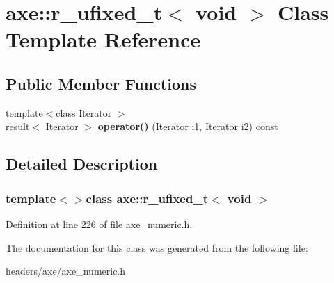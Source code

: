 \hypertarget{classaxe_1_1r__ufixed__t_3_01void_01_4}{\section{axe\+:\+:r\+\_\+ufixed\+\_\+t$<$ void $>$ Class Template Reference}
\label{classaxe_1_1r__ufixed__t_3_01void_01_4}
}
\subsection*{Public Member Functions}
\begin{DoxyCompactItemize}
\item 
\hypertarget{classaxe_1_1r__ufixed__t_3_01void_01_4_a1afe9c1a3c765371717f32177472ef38}{{\footnotesize template$<$class Iterator $>$ }\\\hyperlink{structaxe_1_1result}{result}$<$ Iterator $>$ {\bfseries operator()} (Iterator i1, Iterator i2) const }\label{classaxe_1_1r__ufixed__t_3_01void_01_4_a1afe9c1a3c765371717f32177472ef38}

\end{DoxyCompactItemize}


\subsection{Detailed Description}
\subsubsection*{template$<$$>$class axe\+::r\+\_\+ufixed\+\_\+t$<$ void $>$}



Definition at line 226 of file axe\+\_\+numeric.\+h.



The documentation for this class was generated from the following file\+:\begin{DoxyCompactItemize}
\item 
headers/axe/axe\+\_\+numeric.\+h\end{DoxyCompactItemize}
